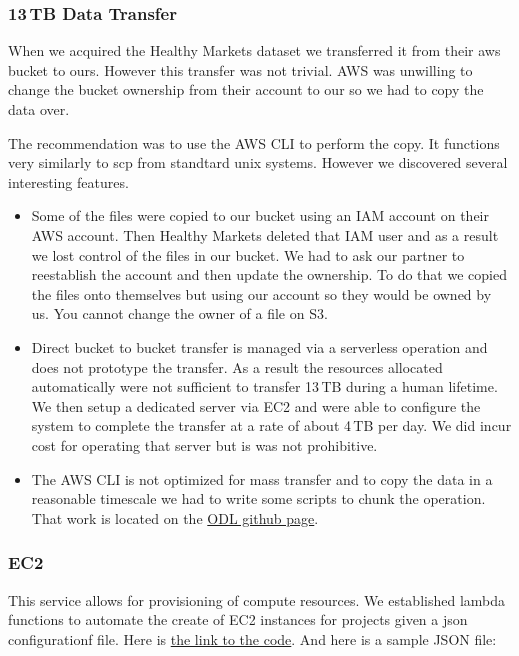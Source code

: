 \subsubsection{13\,TB Data Transfer}
When we acquired the Healthy Markets dataset we transferred it from their aws bucket to ours. However this transfer was not trivial. AWS was unwilling to change the bucket ownership from their account to our so we had to copy the data over.

The recommendation was to use the AWS CLI to perform the copy. It functions very similarly to scp from standtard unix systems. However we discovered several interesting features.
\begin{itemize}
\item Some of the files were copied to our bucket using an IAM account on their AWS account. Then Healthy Markets deleted that IAM user and as a result we lost control of the files in our bucket. We had to ask our partner to reestablish the account and then update the ownership. To do that we copied the files onto themselves but using our account so they would be owned by us. You cannot change the owner of a file on S3.

\item Direct bucket to bucket transfer is managed via a serverless operation and does not prototype the transfer. As a result the resources allocated automatically were not sufficient to transfer 13\,TB during a human lifetime. We then setup a dedicated server via EC2 and were able to configure the system to complete the transfer at a rate of about 4\,TB per day. We did incur cost for operating that server but is was not prohibitive.
\item The AWS CLI is not optimized for mass transfer and to copy the data in a reasonable timescale we had to write some scripts to chunk the operation. That work is located on the \href{https://github.com/UVA-DSI/Open-Data-Lab/tree/master/aws/large_s3_transfer}{ODL github page}.
\end{itemize}

\subsubsection{EC2}
This service allows for provisioning of compute resources. We established lambda functions to automate the create of EC2 instances for projects given a json configurationf file. Here is \href{https://github.com/UVA-DSI/Open-Data-Lab/blob/master/aws/lambda/src/stand_up.py}{the link to the code}. And here is a sample JSON file:

